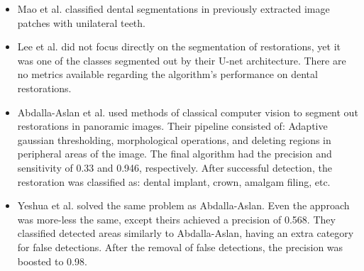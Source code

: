 \begin{itemize}
    \item{Mao et al. \cite{Mao2021}} classified dental segmentations in previously extracted image patches with unilateral teeth.
    \item{Lee et al. \cite{Lee2021}} did not focus directly on the segmentation of restorations, yet it was one of the classes segmented out by their U-net architecture. There are no metrics available regarding the algorithm's performance on dental restorations.
    \item{Abdalla-Aslan et al. \cite{AbdallaAslan2020}} used methods of classical computer vision to segment out restorations in panoramic images. Their pipeline consisted of: Adaptive gaussian thresholding, morphological operations, and deleting regions in peripheral areas of the image. The final algorithm had the precision and sensitivity of 0.33 and 0.946, respectively. After successful detection, the restoration was classified as: dental implant, crown, amalgam filing, etc.
    \item {Yeshua et al. \cite{Yeshua2019}} solved the same problem as Abdalla-Aslan. Even the approach was more-less the same, except theirs achieved a precision of 0.568. They classified detected areas similarly to Abdalla-Aslan, having an extra category for false detections. After the removal of false detections, the precision was boosted to 0.98.
\end{itemize}